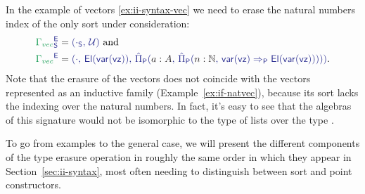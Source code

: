 \begin{example}[Vectors]\label{ex:red-e-vec}
In the example of vectors \ref{ex:ii-syntax-vec} we need to erase the natural numbers
index of the only sort under consideration:
\begin{align*}
\tqm{\grm{\Gamma_{vec}}^\EE_\Sc}
 &= \tqm{(\cdot_\Sc,\, \UU)} \text{ and} \\
\tqm{\grm{\Gamma_{vec}}^\EE}
  &= \tqm{(\cdot,\, \El(\var(\vz)),\, 
    \ExtPiP{a : A}{\ExtPiP{n : \N}{
    \var(\vz) \Rightarrow_\Pc \El(\var(\vz))}})} \text{.}
\end{align*}
Note that the erasure of the vectors does not coincide with the vectors represented
as an inductive family (Example~\ref{ex:if-natvec}), because its sort lacks the
indexing over the natural numbers.
In fact, it's easy to see that the algebras of this signature would not be isomorphic
to the type of lists over the type .
\end{example}

To go from examples to the general case, we will present the different components
of the type erasure operation in roughly the same order in which they appear in
Section~\ref{sec:ii-syntax}, most often needing to distinguish between sort
and point constructors.

